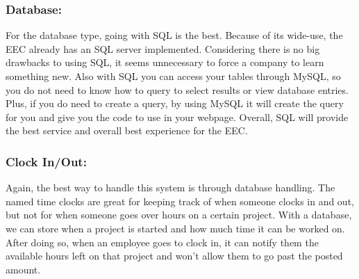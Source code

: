 \documentclass[letterpaper,10pt,titlepage,journal,compsoc,draftclsnofoot,onecolumn]{IEEEtran}
\newcommand\tab[1][1cm]{\hspace*{#1}}
\begin{document}
\subsubsection{Database:}
\tab For the database type, going with SQL is the best. Because of its wide-use, the EEC already has an SQL server implemented. Considering there is no big drawbacks to using SQL, it seems unnecessary to force a company to learn something new. Also with SQL you can access your tables through MySQL, so you do not need to know how to query to select results or view database entries. Plus, if you do need to create a query, by using MySQL it will create the query for you and give you the code to use in your webpage. Overall, SQL will provide the best service and overall best experience for the EEC. \newline

\subsubsection{Clock In/Out:}
\tab Again, the best way to handle this system is through database handling. The named time clocks are great for keeping track of when someone clocks in and out, but not for when someone goes over hours on a certain project. With a database, we can store when a project is started and how much time it can be worked on. After doing so, when an employee goes to clock in, it can notify them the available hours left on that project and won’t allow them to go past the posted amount. \newline
\end{document}
